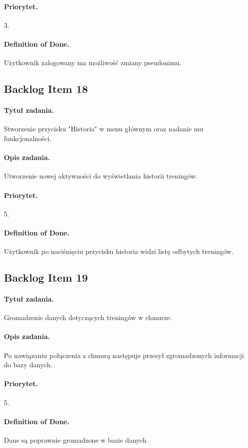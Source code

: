\documentclass[a4paper]{article}
\begin{document}
\paragraph{Priorytet.} 3.
\paragraph{Definition of Done.} Użytkownik zalogowany ma możliwość zmiany pseudonimu.

\subsection{Backlog Item 18}
\paragraph{Tytuł zadania.} Stworzenie przycisku "Historia" w menu głównym oraz nadanie mu funkcjonalności.
\paragraph{Opis zadania.} Utworzenie nowej aktywności do wyświetlania historii treningów. 
\paragraph{Priorytet.} 5.
\paragraph{Definition of Done.} Użytkownik po naciśnięciu przycisku historia widzi listę odbytych treningów.

\subsection{Backlog Item 19}
\paragraph{Tytuł zadania.} Gromadzenie danych dotyczących treningów w chmurze.
\paragraph{Opis zadania.} Po nawiązaniu połączenia z chmurą następuje przesył zgromadzonych informacji do bazy danych. 
\paragraph{Priorytet.} 5.
\paragraph{Definition of Done.} Dane są poprawnie gromadzone w bazie danych.
\end{document}
